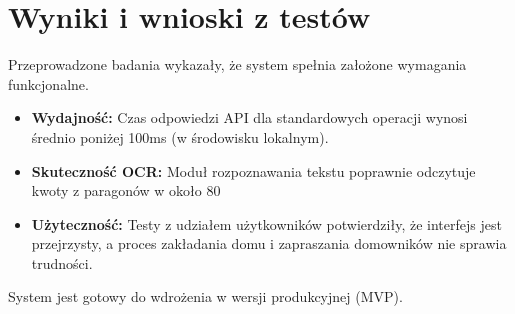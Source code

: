 \section{Wyniki i wnioski z testów}

Przeprowadzone badania wykazały, że system spełnia założone wymagania funkcjonalne.

\begin{itemize}
    \item \textbf{Wydajność:} Czas odpowiedzi API dla standardowych operacji wynosi średnio poniżej 100ms (w środowisku lokalnym).
    \item \textbf{Skuteczność OCR:} Moduł rozpoznawania tekstu poprawnie odczytuje kwoty z paragonów w około 80%
    \item \textbf{Użyteczność:} Testy z udziałem użytkowników potwierdziły, że interfejs jest przejrzysty, a proces zakładania domu i zapraszania domowników nie sprawia trudności.
\end{itemize}

System jest gotowy do wdrożenia w wersji produkcyjnej (MVP).
